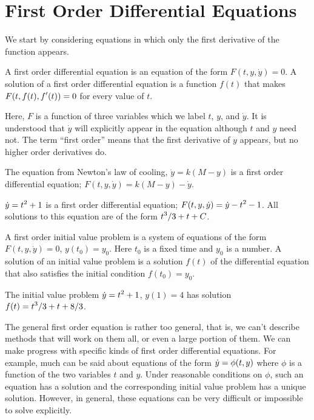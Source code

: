 \section{First Order Differential Equations}{}{}
\nobreak
We start by considering equations in which only the first derivative
of the function appears. 

 A {\dfont first order differential 
equation\/} is an equation of
the form
$F(t, y, \dot{y})=0$.
A solution of a first order differential equation is a
function $f(t)$ that makes $\displaystyle F(t,f(t),f'(t))=0$ for every value of $t$.
\enddef

Here, $F$ is a function of three
variables which we label $t$, $y$, and $\dot{y}$. It is understood
that $\dot{y} $ will explicitly appear in the equation although $t$
and $y$ need not. The term ``first order'' means that the first
derivative of $y$ appears, but no higher order derivatives do.

\example The equation from Newton's law of cooling,
$\dot{y}=k(M-y)$ is a first order
differential equation; $F(t,y,\dot y)=k(M-y)-\dot y$.
\endexample

\example $\displaystyle\dot{y}=t^2+1$ is a first order differential
equation; $\displaystyle F(t,y,\dot y)= \dot y-t^2-1$. All solutions to this
equation are of the form $\displaystyle t^3/3+t+C$. 
\endexample

 A {\dfont first order initial value 
problem\/} is a system of
equations of the form
$F(t, y, \dot{y})=0$, $y(t_0)=y_0$. Here $t_0 $ is a fixed time
and $y_0$ is a number.
A solution of an initial value problem is a solution $f(t)$ of
the differential equation that also satisfies the 
{\dfont initial condition\/}
$f(t_0) = y_0$.
\enddef

\example The initial value problem $\displaystyle\dot{y}=t^2+1$, $y(1)=4$
has solution $\displaystyle f(t)=t^3/3+t+8/3$.
\endexample

The general first order equation is rather too general, that is, 
we can't describe methods that will work on them all, or even a large
portion of them. We can make progress with specific kinds of
first order differential equations.
For example, much can be said about equations of the form
$\displaystyle \dot{y} = \phi (t, y)$ where $\phi $
is a function of the two variables $t$ and $y$.
Under reasonable conditions on $\phi$, such an
equation has a solution and the corresponding 
initial value problem has a unique solution.
However, in general, these equations can be very difficult or
impossible to solve explicitly.

